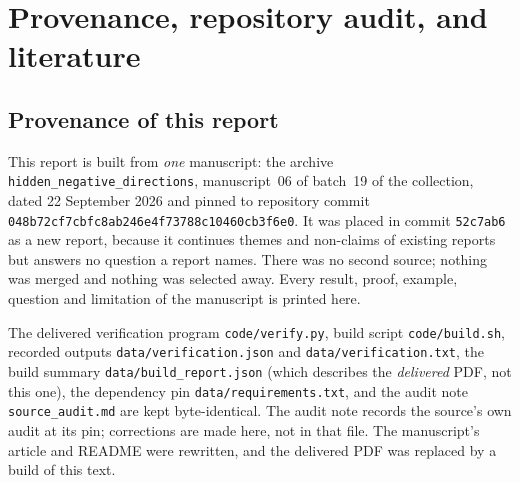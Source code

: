 \documentclass[11pt,oneside]{article}
\theoremstyle{definition}
\theoremstyle{remark}
\newcommand{\repo}[1]{\nolinkurl{#1}}%
\begin{document}
\appendix
\section{Provenance, repository audit, and literature}\label{hnd:app:audit}

\subsection{Provenance of this report}\label{hnd:app:provenance}

This report is built from \emph{one} manuscript: the archive
\texttt{hidden\_negative\_directions}, manuscript~06 of batch~19 of the
collection, dated 22 September 2026 and pinned to repository commit
\nolinkurl{048b72cf7cbfc8ab246e4f73788c10460cb3f6e0}. It was placed in
commit \texttt{52c7ab6} as a new report, because it continues themes and
non-claims of existing reports but answers no question a report names.
There was no second source; nothing was merged and nothing was selected
away. Every result, proof, example, question and limitation of the
manuscript is printed here.

The delivered verification program \repo{code/verify.py}, build script
\repo{code/build.sh}, recorded outputs \repo{data/verification.json} and
\repo{data/verification.txt}, the build summary
\repo{data/build_report.json} (which describes the \emph{delivered} PDF, not
this one), the dependency pin \repo{data/requirements.txt}, and the audit
note \repo{source_audit.md} are kept byte-identical. The audit note
records the source's own audit at its pin; corrections are made here, not
in that file. The manuscript's article and README were rewritten, and the
delivered PDF was replaced by a build of this text.
\end{document}
